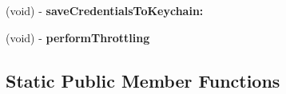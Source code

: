 \begin{DoxyCompactItemize}
\item 
\hypertarget{interface_a_s_i_h_t_t_p_request_a3a57684f5aba49781ec3c9c9ef1516a6}{
(void) -\/ {\bfseries save\-Credentials\-To\-Keychain\-:}}
\label{interface_a_s_i_h_t_t_p_request_a3a57684f5aba49781ec3c9c9ef1516a6}

\item 
\hypertarget{interface_a_s_i_h_t_t_p_request_a510b47cc1be0b9c1968a9c8cc3859038}{
(void) -\/ {\bfseries perform\-Throttling}}
\label{interface_a_s_i_h_t_t_p_request_a510b47cc1be0b9c1968a9c8cc3859038}

\end{DoxyCompactItemize}
\subsection*{\-Static \-Public \-Member \-Functions}
